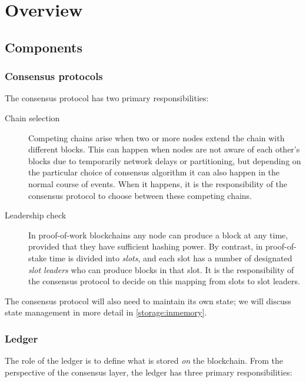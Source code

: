 \chapter{Overview}

\section{Components}

\subsection{Consensus protocols}
\label{overview:consensus}

The consensus protocol has two primary responsibilities:
\label{consensus-responsibilities}

\begin{description}
\item[Chain selection] Competing chains arise when two or more nodes extend the
chain with different blocks. This can happen when nodes are not aware of each
other's blocks due to temporarily network delays or partitioning, but depending
on the particular choice of consensus algorithm it can also happen in the normal
course of events. When it happens, it is the responsibility of the consensus
protocol to choose between these competing chains.

\item[Leadership check] In proof-of-work blockchains any node can produce a
block at any time, provided that they have sufficient hashing power. By
contrast, in proof-of-stake time is divided into \emph{slots}, and each slot has
a number of designated \emph{slot leaders} who can produce blocks in that slot.
It is the responsibility of the consensus protocol to decide on this mapping
from slots to slot leaders.
\end{description}

The consensus protocol will also need to maintain its own state; we will discuss
state management in more detail in \cref{storage:inmemory}.

\subsection{Ledger}
\label{overview:ledger}

The role of the ledger is to define what is stored \emph{on} the blockchain.
From the perspective of the consensus layer, the ledger has three primary
responsibilities:

